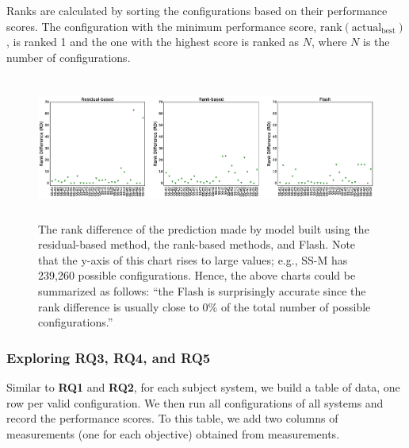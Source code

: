 \documentclass[10pt,journal,compsoc]{IEEEtran}
\newcommand{\flash}{{\sc Flash}\xspace}
\begin{document}
\noindent Ranks are calculated by sorting the configurations based on their performance scores. The configuration with the minimum performance score, $\mathrm{rank(actual_{best})}$, is ranked 1 and the one with the highest score is ranked as $N$, where $N$ is the number of configurations.



\begin{figure}[t]
\centering
\includegraphics[width=0.85\paperwidth, height=4.7cm]{Figures/one_obj_rd.eps}
\caption{
    \small{The rank difference of the prediction made by model built using the residual-based method, the rank-based methods, and \flash. Note that the y-axis of this chart rises to large values; e.g., SS-M has 239,260 possible configurations. Hence, the above charts could be summarized as follows: ``the \flash is surprisingly accurate since the rank difference is usually close to 0\% of the total number of possible configurations.'' 
    }
}\label{fig:one_obj_rd}
\end{figure}

\subsubsection{Exploring RQ3, RQ4, and RQ5}\label{sec:exp_mo}
Similar to \textbf{RQ1} and \textbf{RQ2}, for each subject system, we build a table of data, one row per valid configuration. We then run all configurations of all systems and record the performance scores. To this table, we add two columns of measurements (one for each objective) obtained from measurements.
\end{document}

